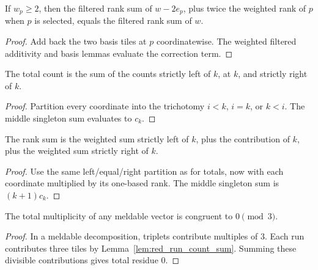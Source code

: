 \begin{lemma}

  \label{lem:filtered_rank_remove_pair_add_pair}
  If \(w_p\ge2\), then the filtered rank sum of \(w-2e_p\), plus twice
  the weighted rank of \(p\) when \(p\) is selected, equals the filtered
  rank sum of \(w\).
\end{lemma}
\begin{proof}

\leanok
  Add back the two basis tiles at \(p\) coordinatewise.  The weighted
  filtered additivity and basis lemmas evaluate the correction term.
\end{proof}

\begin{lemma}

  \label{lem:total_split_at}
  The total count is the sum of the counts strictly left of \(k\), at
  \(k\), and strictly right of \(k\).
\end{lemma}
\begin{proof}

\leanok
  Partition every coordinate into the trichotomy \(i<k\), \(i=k\), or
  \(k<i\).  The middle singleton sum evaluates to \(c_k\).
\end{proof}

\begin{lemma}

  \label{lem:rank_sum_split_at}
  The rank sum is the weighted sum strictly left of \(k\), plus the
  contribution of \(k\), plus the weighted sum strictly right of \(k\).
\end{lemma}
\begin{proof}

\leanok
  Use the same left/equal/right partition as for totals, now with each
  coordinate multiplied by its one-based rank.  The middle singleton sum
  is \((k+1)c_k\).
\end{proof}

\begin{lemma}

  \label{lem:meldable_total_mod}
  The total multiplicity of any meldable vector is congruent to
  \(0\pmod3\).
\end{lemma}
\begin{proof}

\leanok
  In a meldable decomposition, triplets contribute multiples of \(3\).
  Each run contributes three tiles by
  Lemma~\ref{lem:red_run_count_sum}.  Summing these divisible
  contributions gives total residue \(0\).
\end{proof}

